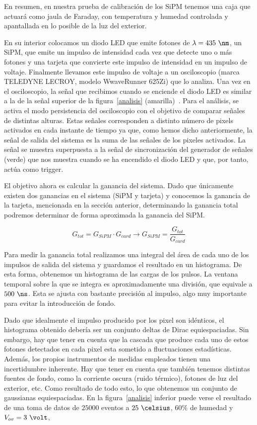 En resumen, en nuestra prueba de calibración de los SiPM tenemos una caja que actuará como jaula de Faraday, con temperatura y humedad controlada y apantallada en lo posible de la luz del exterior. 

En su interior colocamos un diodo LED que emite fotones de $\lambda=435~\nm$, un SiPM, que emite un impulso de intensidad cada vez que detecte uno o más  fotones  y una tarjeta que convierte este impulso de intensidad en un impulso de voltaje. Finalmente llevamos este impulso de voltaje a un osciloscopio (marca TELEDYNE LECROY, modelo WwaveRunner 625Zi) que lo analiza. 
Una vez en el osciloscopio, la señal que recibimos cuando se enciende el diodo LED es similar a la de la señal superior de la figura~\ref{analisis} (amarilla)~\cite{inftec}. Para el análisis,  se  activa el modo persistencia del osciloscopio con el objetivo de comparar señales de distintas alturas. Estas señales corresponden a distinto número de pixels activados en cada instante de tiempo ya que, como hemos dicho anteriormente, la señal de salida del sistema es la suma de las señales de los pixeles activados. La señal se muestra superpuesta a la señal de sincronización del generador de señales (verde) que nos muestra cuando se ha encendido el diodo LED y que, por tanto, actúa como trigger.

El objetivo ahora es calcular la ganancia del sistema. Dado que únicamente existen dos ganancias en el sistema (SiPM y tarjeta) y conocemos la ganancia de la tarjeta, mencionada en la sección anterior, determinando la ganancia total podremos determinar de forma aproximada la ganancia del SiPM. 

\begin{equation}
G_{tot}=G_{SiPM} \cdotp G_{card} \longrightarrow G_{SiPM} = \frac{G_{tot}}{G_{card}}
\label{ganancias}
\end{equation}

Para medir la ganancia total realizamos una integral del área de cada uno de los impulsos de salida del sistema y guardamos el resultado en un histograma. De esta forma, obtenemos un histograma de las cargas de los pulsos. La ventana temporal sobre la que se integra es aproximadamente una división, que equivale a $500~\ns$. Esta se ajusta con bastante precisión al impulso, algo muy importante para evitar la introducción de fondo.

Dado que idealmente el impulso producido por  los pixel son idénticos, el histograma obtenido debería ser  un conjunto deltas de Dirac equiespaciadas. Sin embargo, hay que tener en cuenta que la cascada que produce cada uno de estos fotones detectados en cada pixel esta sometido a fluctuaciones estadísticas. Además, los propios instrumentos de medidas empleados tienen una incertidumbre inherente. Hay que tener en cuenta que también tenemos distintas fuentes de fondo, como la corriente oscura (ruido térmico), fotones de luz del exterior, etc. 
Como resultado de todo esto, lo que obtenemos un conjunto de gaussianas equiespaciadas. En la figura~\ref{analisis} inferior puede verse el resultado de una toma de datos de $25000$ eventos a $25~\celsius$, $60\%$ de humedad y $V_{ov}=3~\volt$,

